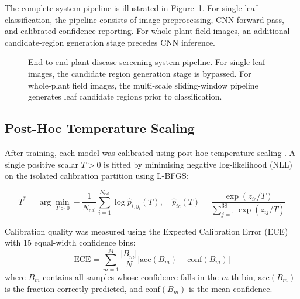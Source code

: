 \documentclass[pdflatex,sn-mathphys-num]{sn-jnl}
\theoremstyle{thmstyleone}%
\theoremstyle{thmstyletwo}%
\theoremstyle{thmstylethree}%
\begin{document}
The complete system pipeline is illustrated in Figure~\ref{fig:pipeline}. For single-leaf
classification, the pipeline consists of image preprocessing, CNN forward pass, and
calibrated confidence reporting. For whole-plant field images, an additional candidate-region
generation stage precedes CNN inference.

\begin{figure}[h]
  \centering
  \caption{End-to-end plant disease screening system pipeline. For single-leaf images,
  the candidate region generation stage is bypassed. For whole-plant field images, the
  multi-scale sliding-window pipeline generates leaf candidate regions prior to
  classification.}
  \label{fig:pipeline}
\end{figure}

\subsection{Post-Hoc Temperature Scaling}
\label{sec:calibration_method}

After training, each model was calibrated using post-hoc temperature scaling
\citep{guo2017calibration}. A single positive scalar $T > 0$ is fitted by minimising
negative log-likelihood (NLL) on the isolated calibration partition using L-BFGS:

\begin{equation}
  T^* = \arg\min_{T > 0} -\frac{1}{N_{\text{cal}}} \sum_{i=1}^{N_{\text{cal}}}
  \log \hat{p}_{i, y_i}(T),
  \quad \hat{p}_{ic}(T) = \frac{\exp(z_{ic}/T)}{\sum_{j=1}^{38} \exp(z_{ij}/T)}
  \label{eq:temperature_scaling}
\end{equation}

Calibration quality was measured using the Expected Calibration Error (ECE) with 15
equal-width confidence bins:
\begin{equation}
  \text{ECE} = \sum_{m=1}^{M} \frac{|B_m|}{N}
  \left|\text{acc}(B_m) - \text{conf}(B_m)\right|
  \label{eq:ece}
\end{equation}
where $B_m$ contains all samples whose confidence falls in the $m$-th bin,
$\text{acc}(B_m)$ is the fraction correctly predicted, and $\text{conf}(B_m)$ is the
mean confidence.
\end{document}
